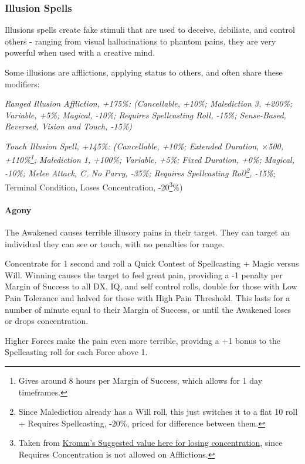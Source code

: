 \begin{multicols*}{3}
	\subsubsection{Illusion Spells}
	
	Illusions spells create fake stimuli that are used to deceive, debiliate, and control others - ranging from visual hallucinations to phantom pains, they are very powerful when used with a creative mind.
	
	Some illusions are afflictions, applying status to others, and often share these modifiers:
	
	\textcolor{OliveGreen}{\textit{Ranged Illusion Affliction, +175\%: (Cancellable, +10\%; Malediction 3, +200\%; Variable, +5\%; Magical, -10\%; Requires Spellcasting Roll, -15\%; Sense-Based, Reversed, Vision and Touch, -15\%) }}
	
	\textcolor{OliveGreen}{\textit{Touch Illusion Spell, +145\%: (Cancellable, +10\%; Extended Duration, \(\times\)500, +110\%\footnote{Gives around 8 hours per Margin of Success, which allows for 1 day timeframes.}; Malediction 1, +100\%; Variable, +5\%; Fixed Duration, +0\%; Magical, -10\%; Melee Attack, C, No Parry, -35\%; Requires Spellcasting Roll\footnote{Since Malediction already has a Will roll, this just switches it to a flat 10 roll + Requires Spellcasting, -20\%, priced for difference between them.}, -15\%}; Terminal Condition, Loses Concentration, -20\footnote{Taken from \textcolor{Blue}{\href{http://forums.sjgames.com/showpost.php?p=817197&postcount=7}{Kromm's Suggested value here for losing concentration}}, since Requires Concentration is not allowed on Afflictions.}\%)}
	
	\paragraph{Agony}
	
	The Awakened causes terrible illusory pains in their target. They can target an individual they can see or touch, with no penalties for range.
	
	Concentrate for 1 second and roll a Quick Contest of Spellcasting + Magic versus Will. Winning causes the target to feel great pain, providing a -1 penalty per Margin of Success to all DX, IQ, and self control rolls, double for those with Low Pain Tolerance and halved for those with High Pain Threshold. This lasts for a number of minute equal to their Margin of Success, or until the Awakened loses or drops concentration.
	
	Higher Forces make the pain even more terrible, providng a +1 bonus to the Spellcasting roll for each Force above 1.
	

\end{multicols*}
